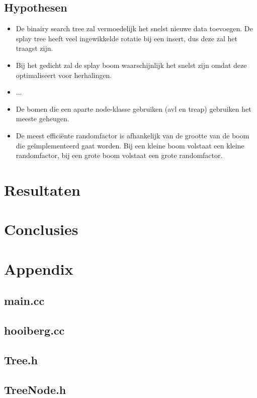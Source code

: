 \documentclass[a4paper,10pt]{article}
\begin{document}
\subsection{Hypothesen}

\begin{itemize}
\item De binairy search tree zal vermoedelijk het snelst nieuwe data toevoegen. De splay tree heeft veel ingewikkelde rotatie bij een insert, dus deze zal het traagst zijn.
\item Bij het gedicht zal de splay boom waarschijnlijk het snelst zijn omdat deze optimaliseert voor herhalingen.
\item ...
\item De bomen die een aparte node-klasse gebruiken (avl en treap) gebruiken het meeste geheugen.
\item De meest effici\"ente randomfactor is afhankelijk van de grootte van de boom die geïmplementeerd gaat worden. Bij een kleine boom volstaat een kleine randomfactor, bij een grote boom volstaat een grote randomfactor.
\end{itemize}

\section{Resultaten}

\section{Conclusies}

\section{Appendix}

\subsection{main.cc}

\subsection{hooiberg.cc}

\subsection{Tree.h}

\subsection{TreeNode.h}

\end{document}
